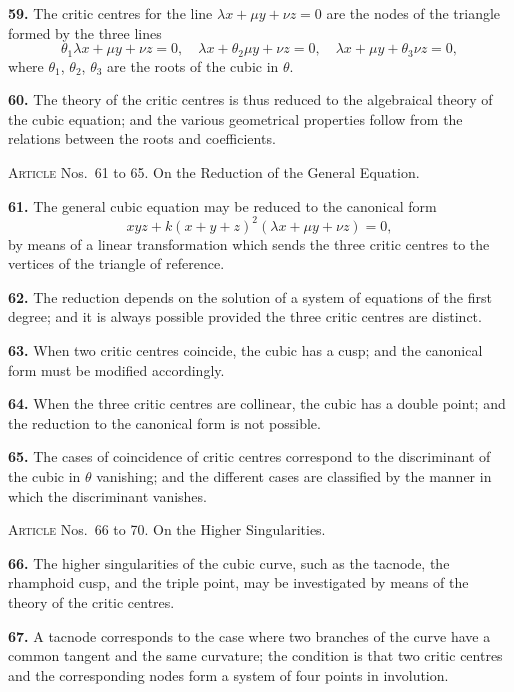 \documentclass[11pt,a4paper]{article}
\theoremstyle{plain}
\theoremstyle{definition}
\begin{document}
\textbf{59.} The critic centres for the line $\lambda x + \mu y + \nu z = 0$ are the nodes of the triangle formed by the three lines
\[
\theta_1\lambda x + \mu y + \nu z = 0,\quad
\lambda x + \theta_2\mu y + \nu z = 0,\quad
\lambda x + \mu y + \theta_3\nu z = 0,
\]
where $\theta_1$, $\theta_2$, $\theta_3$ are the roots of the cubic in $\theta$.

\textbf{60.} The theory of the critic centres is thus reduced to the algebraical theory of the cubic equation; and the various geometrical properties follow from the relations between the roots and coefficients.

\bigskip

\noindent\textsc{Article} Nos.~61 to 65.  On the Reduction of the General Equation.

\medskip

\textbf{61.} The general cubic equation may be reduced to the canonical form
\[
xyz + k(x + y + z)^2(\lambda x + \mu y + \nu z) = 0,
\]
by means of a linear transformation which sends the three critic centres to the vertices of the triangle of reference.

\textbf{62.} The reduction depends on the solution of a system of equations of the first degree; and it is always possible provided the three critic centres are distinct.

\textbf{63.} When two critic centres coincide, the cubic has a cusp; and the canonical form must be modified accordingly.

\textbf{64.} When the three critic centres are collinear, the cubic has a double point; and the reduction to the canonical form is not possible.

\textbf{65.} The cases of coincidence of critic centres correspond to the discriminant of the cubic in $\theta$ vanishing; and the different cases are classified by the manner in which the discriminant vanishes.

\bigskip

\noindent\textsc{Article} Nos.~66 to 70.  On the Higher Singularities.

\medskip

\textbf{66.} The higher singularities of the cubic curve, such as the tacnode, the rhamphoid cusp, and the triple point, may be investigated by means of the theory of the critic centres.

\textbf{67.} A tacnode corresponds to the case where two branches of the curve have a common tangent and the same curvature; the condition is that two critic centres and the corresponding nodes form a system of four points in involution.
\end{document}
